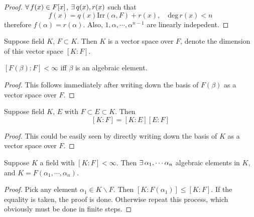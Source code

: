 \begin{proof}
    $\forall\, f(x)\in F[x]$, $\exists\, q(x), r(x)$ such that
    $$
    f(x)=q(x)\mathrm{Irr}(\alpha, F)+r(x),\quad \mathrm{deg}\,r(x)<n
    $$
    therefore $f(\alpha)=r(\alpha)$. Also, $1,\alpha,\cdots,\alpha^{n-1}$ are linearly indepedent.
\end{proof}
\begin{definition}
    Suppose field $K$, $F\subset K$. Then $K$ is a vector space over $F$, denote the dimension of this vector space $[K:F]$.
\end{definition}
\begin{proposition}
    $[F(\beta):F]<\infty$ iff $\beta$ is an algebraic element.
\end{proposition}
\begin{proof}
    This follows immediately after writing down the basis of $F(\beta)$ as a vector space over $F$.
\end{proof}
\begin{proposition}
    Suppose field $K$, $E$ with $F\subset E\subset K$. Then
    $$
    [K:F]=[K:E][E:F]
    $$
\end{proposition}
\begin{proof}
    This could be easily seen by directly writing down the basis of $K$ as a vector space over $F$.
\end{proof}
\begin{proposition}
    Suppose $K$ a field with $[K:F]<\infty$. Then $\exists\, \alpha_1,\cdots\alpha_n$ algebraic elements in $K$, and $K=F(\alpha_1,\cdots,\alpha_n)$.
\end{proposition}
\begin{proof}
    Pick any element $\alpha_1\in K\backslash F$. Then $[K:F(\alpha_1)]\le[K:F]$. If the equality is taken, the proof is done. Otherwise repeat this process, which obviously must be done in finite steps.
\end{proof}